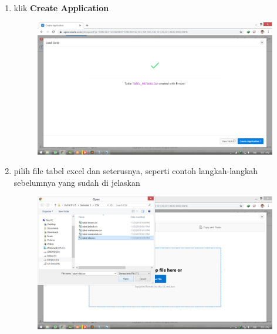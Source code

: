 \documentclass[11pt]{article}
\begin{document}
\begin{enumerate}
\item klik \textbf{Create Application}
	\begin{figure}[h]
        \centerline{\includegraphics[scale=0.1]{img/21.png}}
        \centering
        \caption{}
		\label{langkah27}
	\end{figure}
	
\newpage
\item pilih file tabel excel dan seterusnya, seperti contoh langkah-langkah sebelumnya yang sudah di jelaskan
	\begin{figure}[h]
        \centerline{\includegraphics[scale=0.1]{img/22.png}}
        \centering
        \caption{}
		\label{langkah22}
	\end{figure}
	

\end{enumerate}
\end{document}
